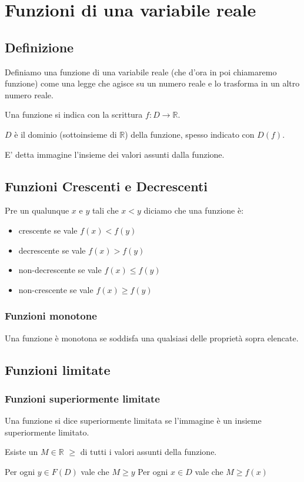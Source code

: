 \chapter{Funzioni di una variabile reale}

\section{Definizione}
Definiamo una funzione di una variabile reale (che d'ora in poi chiamaremo funzione) come una legge che agisce su un numero reale e lo trasforma in un altro numero reale.

Una funzione si indica con la scrittura $f:D \rightarrow \mathbb{R}$.

$D$ è il dominio (sottoinsieme di $\mathbb{R}$) della funzione, spesso indicato con $D(f)$. 

E' detta immagine l'insieme dei valori assunti dalla funzione.

\section{Funzioni Crescenti e Decrescenti}
Pre un qualunque $x$ e $y$ tali che $x<y$ diciamo che una funzione è:
\begin{itemize}
\item crescente se vale $f(x)<f(y)$
\item decrescente se vale $f(x)>f(y)$
\item non-decrescente se vale $f(x)\leq f(y)$
\item non-crescente se vale $f(x)\geq f(y)$
\end{itemize}

\subsection{Funzioni monotone}
Una funzione è monotona se soddisfa una qualsiasi delle proprietà sopra elencate.

\section{Funzioni limitate}
\subsection{Funzioni superiormente limitate}
Una funzione si dice superiormente limitata se l'immagine è un insieme superiormente limitato.

\begin{tip}
Esiste un $M\in\mathbb{R}$ $\geq$ di tutti i valori assunti della funzione.

Per ogni $y \in F(D)$ vale che $M \geq y$
Per ogni $x \in D$ vale che $M \geq f(x)$
\end{tip} 

